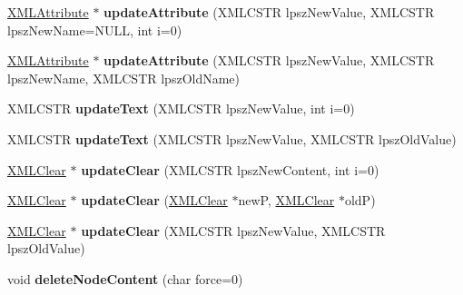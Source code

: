 \begin{DoxyCompactItemize}
\item 
\hyperlink{struct_x_m_l_attribute}{X\+M\+L\+Attribute} $\ast$ {\bfseries update\+Attribute} (X\+M\+L\+C\+S\+TR lpsz\+New\+Value, X\+M\+L\+C\+S\+TR lpsz\+New\+Name=N\+U\+LL, int i=0)\hypertarget{struct_x_m_l_node_a21bdabc3bea95c06b5033a0a0c76afe4}{}\label{struct_x_m_l_node_a21bdabc3bea95c06b5033a0a0c76afe4}

\item 
\hyperlink{struct_x_m_l_attribute}{X\+M\+L\+Attribute} $\ast$ {\bfseries update\+Attribute} (X\+M\+L\+C\+S\+TR lpsz\+New\+Value, X\+M\+L\+C\+S\+TR lpsz\+New\+Name, X\+M\+L\+C\+S\+TR lpsz\+Old\+Name)\hypertarget{struct_x_m_l_node_ab81bdf55327b63350eaf84835b8cf9b1}{}\label{struct_x_m_l_node_ab81bdf55327b63350eaf84835b8cf9b1}

\item 
X\+M\+L\+C\+S\+TR {\bfseries update\+Text} (X\+M\+L\+C\+S\+TR lpsz\+New\+Value, int i=0)\hypertarget{struct_x_m_l_node_aad04ffd86ca67253bbc81f941608f8d2}{}\label{struct_x_m_l_node_aad04ffd86ca67253bbc81f941608f8d2}

\item 
X\+M\+L\+C\+S\+TR {\bfseries update\+Text} (X\+M\+L\+C\+S\+TR lpsz\+New\+Value, X\+M\+L\+C\+S\+TR lpsz\+Old\+Value)\hypertarget{struct_x_m_l_node_a476a872fa595ea8416d2991ce3bea7a6}{}\label{struct_x_m_l_node_a476a872fa595ea8416d2991ce3bea7a6}

\item 
\hyperlink{struct_x_m_l_clear}{X\+M\+L\+Clear} $\ast$ {\bfseries update\+Clear} (X\+M\+L\+C\+S\+TR lpsz\+New\+Content, int i=0)\hypertarget{struct_x_m_l_node_a6b48e123943ea53272f6d4be33ca6d04}{}\label{struct_x_m_l_node_a6b48e123943ea53272f6d4be33ca6d04}

\item 
\hyperlink{struct_x_m_l_clear}{X\+M\+L\+Clear} $\ast$ {\bfseries update\+Clear} (\hyperlink{struct_x_m_l_clear}{X\+M\+L\+Clear} $\ast$newP, \hyperlink{struct_x_m_l_clear}{X\+M\+L\+Clear} $\ast$oldP)\hypertarget{struct_x_m_l_node_a02e1a7e3f9c48e05fad77abda2116375}{}\label{struct_x_m_l_node_a02e1a7e3f9c48e05fad77abda2116375}

\item 
\hyperlink{struct_x_m_l_clear}{X\+M\+L\+Clear} $\ast$ {\bfseries update\+Clear} (X\+M\+L\+C\+S\+TR lpsz\+New\+Value, X\+M\+L\+C\+S\+TR lpsz\+Old\+Value)\hypertarget{struct_x_m_l_node_a690b140b6d86776f3a257a42ce7d4948}{}\label{struct_x_m_l_node_a690b140b6d86776f3a257a42ce7d4948}

\item 
void {\bfseries delete\+Node\+Content} (char force=0)\hypertarget{struct_x_m_l_node_abbb236ca1081f145a04bce9ea03c62a6}{}\label{struct_x_m_l_node_abbb236ca1081f145a04bce9ea03c62a6}


\end{DoxyCompactItemize}
